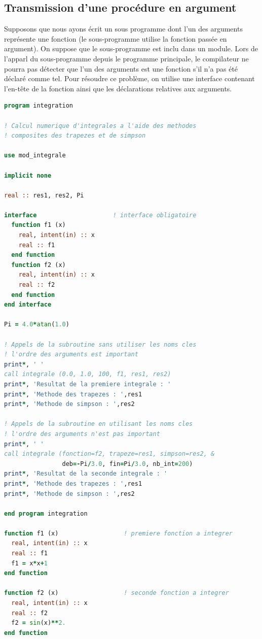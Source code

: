 \documentclass[a4paper,twoside]{article}
\begin{document}
\subsection{Transmission d'une procédure en argument}
Supposons que nous ayons écrit un sous programme dont l'un des arguments représente une fonction (le sous-programme utilise la fonction passée en argument). On suppose que le sous-programme est inclu dans un module. Lors de l'apparl du sous-programme depuis le programme principale, le compilateur ne pourra pas détecter que l'un des arguments est une fonction s'il n'a pas été déclaré comme tel. Pour résoudre ce problème, on utilise une interface contenant l'en-tête de la fonction ainsi que les déclarations relatives aux arguments. 
\begin{lstlisting}[language=Fortran]
program integration

! Calcul numerique d'integrales a l'aide des methodes
! composites des trapezes et de simpson

use mod_integrale

implicit none

real :: res1, res2, Pi

interface                     ! interface obligatoire
  function f1 (x)
    real, intent(in) :: x
    real :: f1
  end function
  function f2 (x)
    real, intent(in) :: x
    real :: f2
  end function
end interface

Pi = 4.0*atan(1.0)

! Appels de la subroutine sans utiliser les noms cles
! l'ordre des arguments est important
print*, ' '
call integrale (0.0, 1.0, 100, f1, res1, res2)
print*, 'Resultat de la premiere integrale : '
print*, 'Methode des trapezes : ',res1
print*, 'Methode de simpson : ',res2

! Appels de la subroutine en utilisant les noms cles
! l'ordre des arguments n'est pas important
print*, ' '
call integrale (fonction=f2, trapeze=res1, simpson=res2, &
                deb=-Pi/3.0, fin=Pi/3.0, nb_int=200)
print*, 'Resultat de la seconde integrale : '
print*, 'Methode des trapezes : ',res1
print*, 'Methode de simpson : ',res2

end program integration

function f1 (x)                  ! premiere fonction a integrer
  real, intent(in) :: x
  real :: f1
  f1 = x*x+1
end function

function f2 (x)                  ! seconde fonction a integrer
  real, intent(in) :: x
  real :: f2
  f2 = sin(x)**2.
end function
\end{lstlisting}
\end{document}

